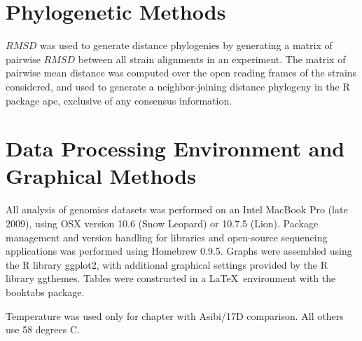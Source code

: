 \section{Phylogenetic Methods}
$RMSD$ was used to generate distance phylogenies by generating a matrix of pairwise $RMSD$ between all strain alignments in an experiment. The matrix
of pairwise mean distance was computed over the open reading frames of the strains considered, and used to generate a neighbor-joining distance phylogeny in the R package ape, exclusive of any consensus information.

\section{Data Processing Environment and Graphical Methods}
All analysis of genomics datasets was performed on an Intel MacBook Pro (late 2009), using OSX version 10.6 (Snow Leopard) or 10.7.5 (Lion). Package management and version handling for libraries and open-source sequencing applications was performed using Homebrew 0.9.5. Graphs were assembled using the R library ggplot2, with additional graphical settings provided by the R library ggthemes. Tables were constructed in a \LaTeX~environment with the booktabs package.
\clearpage

\begin{table}
	\centering
	\caption{Primers for RT-PCR amplifications.}
	\begin{ThreePartTable}
	
		
		\begin{tablenotes}
			\item[a]Temperature was used only for chapter with Asibi/17D comparison. All others use 58 degrees C.
		\end{tablenotes}
	\end{ThreePartTable}
	\label{tab_NGS_primers}
\end{table}
\clearpage




